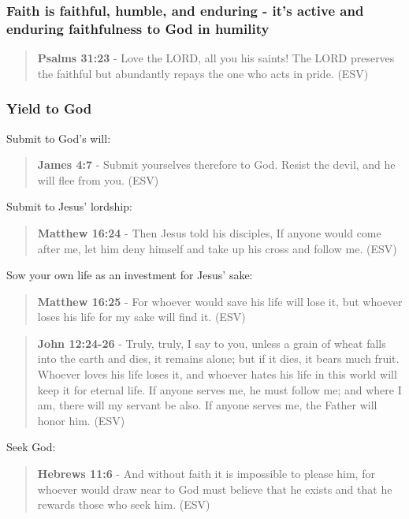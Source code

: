 \documentclass[11pt]{article}
\begin{document}
\subsubsection{Faith is faithful, humble, and enduring - it's active and enduring faithfulness to God in humility}
\label{sec:org6335d5b}
\begin{quote}
\textbf{Psalms 31:23} - Love the LORD, all you his saints! The LORD preserves the faithful but abundantly repays the one who acts in pride. (ESV)
\end{quote}

\subsubsection{Yield to God}
\label{sec:orgdce3a71}
Submit to God's will:

\begin{quote}
\textbf{James 4:7} - Submit yourselves therefore to God. Resist the devil, and he will flee from you. (ESV)
\end{quote}

Submit to Jesus' lordship:

\begin{quote}
\textbf{Matthew 16:24} - Then Jesus told his disciples, If anyone would come after me, let him deny himself and take up his cross and follow me. (ESV)
\end{quote}

Sow your own life as an investment for Jesus' sake:

\begin{quote}
\textbf{Matthew 16:25} - For whoever would save his life will lose it, but whoever loses his life for my sake will find it. (ESV)
\end{quote}

\begin{quote}
\textbf{John 12:24-26} - Truly, truly, I say to you, unless a grain of wheat falls into the earth and dies, it remains alone; but if it dies, it bears much fruit. Whoever loves his life loses it, and whoever hates his life in this world will keep it for eternal life. If anyone serves me, he must follow me; and where I am, there will my servant be also. If anyone serves me, the Father will honor him. (ESV)
\end{quote}

Seek God:

\begin{quote}
\textbf{Hebrews 11:6} - And without faith it is impossible to please him, for whoever would draw near to God must believe that he exists and that he rewards those who seek him. (ESV)
\end{quote}
\end{document}
